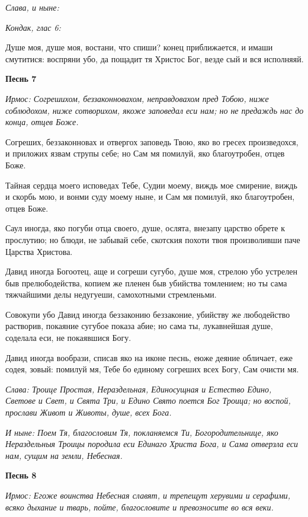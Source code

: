 \itshape Слава, и ныне\normalfont{}: 

\itshape Кондак, глас 6: 

\normalfont{}Душе моя, душе моя, востани, что спиши? конец приближается, и имаши смутитися: воспряни убо, да пощадит тя Христос Бог, везде сый и вся исполняяй. 

\medskip\bfseries Песнь 7\normalfont{}

\itshape Ирмос\normalfont{}: Согрешихом, беззаконновахом, неправдовахом пред Тобою, ниже соблюдохом, ниже сотворихом, якоже заповедал еси нам; но не предаждь нас до конца, отцев Боже. 

Согреших, беззаконновах и отвергох заповедь Твою, яко во гресех произведохся, и приложих язвам струпы себе; но Сам мя помилуй, яко благоутробен, отцев Боже. 

Тайная сердца моего исповедах Тебе, Судии моему, виждь мое смирение, виждь и скорбь мою, и вонми суду моему ныне, и Сам мя помилуй, яко благоутробен, отцев Боже. 

Саул иногда, яко погуби отца своего, душе, ослята, внезапу царство обрете к прослутию; но блюди, не забывай себе, скотския похоти твоя произволивши паче Царства Христова. 

Давид иногда Богоотец, аще и согреши сугубо, душе моя, стрелою убо устрелен быв прелюбодейства, копием же пленен быв убийства томлением; но ты сама тяжчайшими делы недугуеши, самохотными стремленьми. 

Совокупи убо Давид иногда беззаконию беззаконие, убийству же любодейство растворив, покаяние сугубое показа абие; но сама ты, лукавнейшая душе, соделала еси, не покаявшися Богу. 

Давид иногда вообрази, списав яко на иконе песнь, еюже деяние обличает, еже содея, зовый: помилуй мя, Тебе бо единому согреших всех Богу, Сам очисти мя. 

\itshape Слава\normalfont{}: Троице Простая, Нераздельная, Единосущная и Естество Едино, Светове и Свет, и Свята Три, и Едино Свято поется Бог Троица; но воспой, прослави Живот и Животы, душе, всех Бога. 

\itshape И ныне\normalfont{}: Поем Тя, благословим Тя, покланяемся Ти, Богородительнице, яко Нераздельныя Троицы породила еси Единаго Христа Бога, и Сама отверзла еси нам, сущим на земли, Небесная. 

\medskip\bfseries Песнь 8\normalfont{}

\itshape Ирмос\normalfont{}: Егоже воинства Небесная славят, и трепещут херувими и серафими, всяко дыхание и тварь, пойте, благословите и превозносите во вся веки. 

